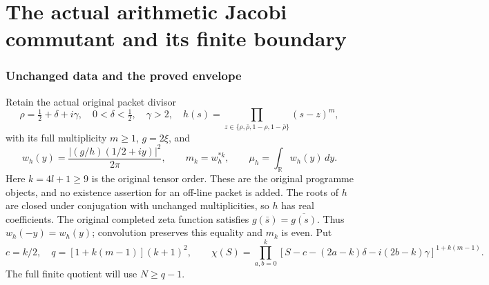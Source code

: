 \documentclass[11pt]{article}
\begin{document}
\endgroup

\clearpage\begingroup
\part*{The actual arithmetic Jacobi commutant and its finite boundary}
\newtheorem{ljacobitheorem}{Theorem}
\newtheorem{ljacobiproposition}[ljacobitheorem]{Proposition}
\newcommand{\ljacobiR}{\mathbb R}
\newcommand{\ljacobiC}{\mathbb C}
\newcommand{\ljacobiN}{\mathbb N}
\newcommand{\ljacobiJ}{\mathcal J}
\newcommand{\ljacobiCC}{\mathcal C}
\newcommand{\ljacobiDom}{\operatorname{Dom}}



\section{Unchanged data and the proved envelope}

Retain the actual original packet divisor
\[
 \rho=\tfrac12+\delta+i\gamma,\quad 0<\delta<\tfrac12,\quad\gamma>2,
 \quad h(s)=\prod_{z\in\{\rho,\bar\rho,1-\rho,1-\bar\rho\}}(s-z)^m,
\]
with its full multiplicity $m\geq1$, $g=2\xi$, and
\[
 w_h(y)=\frac{|(g/h)(1/2+iy)|^2}{2\pi},\qquad
 m_k=w_h^{*k},\qquad \mu_h=\int_\ljacobiR w_h(y)\,dy.
\]
Here $k=4l+1\geq9$ is the original tensor order. These are the
original programme objects, and no existence assertion for an
off-line packet is added. The roots of $h$ are closed under conjugation
with unchanged multiplicities, so $h$ has real coefficients. The
original completed zeta function satisfies
$g(\bar s)=\overline{g(s)}$. Thus $w_h(-y)=w_h(y)$; convolution
preserves this equality and $m_k$ is even. Put
\[
 c=k/2,\quad q=[1+k(m-1)](k+1)^2,\qquad
 \chi(S)=\prod_{a,b=0}^k
 [S-c-(2a-k)\delta-i(2b-k)\gamma]^{1+k(m-1)}.
\]
The full finite quotient will use $N\geq q-1$.
\end{document}
